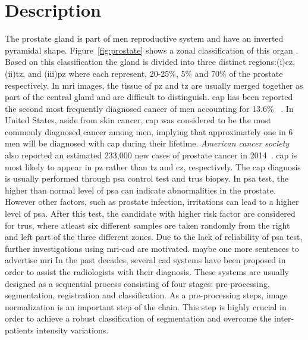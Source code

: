 \graphicspath{ {./content/intro/figures/} }

\section{Description}
\label{sec:descr}  %
The prostate gland is part of men reproductive system and have an inverted pyramidal shape. 
Figure~\ref{fig:prostate} shows a zonal classification of this organ \cite{mcneal1981zonal}. 
Based on this classification the gland is divided into three distinct regions:(i)\ac{cz}, (ii)\ac{tz}, and (iii)\ac{pz} where each represent, 20-25\%, 5\% and 70\% of the prostate respectively. 
In \ac{mri} images, the tissue of \ac{pz} and \ac{tz} are usually merged together as part of the central gland and are difficult to distinguish. 
\ac{cap} has been reported the second most frequently diagnosed cancer of men accounting for 13.6\% ~\cite{ferlay2010estimates}. 
In United States, aside from skin cancer, \ac{cap} was considered to be the most commonly diagnosed cancer among men, implying that approximately one in 6 men will be diagnosed with \ac{cap} during their lifetime. 
\textit{American cancer society} also reported an estimated 233,000 new cases of prostate cancer in 2014~\cite{CancerFactsFigures2014}. 
\Ac{cap} is most likely to appear in \ac{pz} rather than \ac{tz} and \ac{cz}, respectively. 
The \ac{cap} diagnosis is usually performed through \ac{psa} control test and \ac{trus} biopsy.
In \Ac{psa} test, the higher than normal level of \ac{psa} can indicate abnormalities in the prostate. 
However other factors, such as prostate infection, irritations can lead to a higher level of \ac{psa}.
After this test, the candidate with higher risk factor are considered for \ac{trus}, where atleast six different samples are taken randomly from the right and left part of the three different zones. 
Due to the lack of reliability of \ac{psa} test, further investigations using \ac{mri}-\ac{cad} are motivated. 
{\color{red}maybe one more sentences to advertise \ac{mri}}
In the past decades, several \ac{cad} systems have been proposed in order to assist the radiologists with their diagnosis. These systems are usually designed as a sequential process consisting of four stages: pre-processing, segmentation, registration and classification.
As a pre-processing steps, image normalization is an important step of the chain. 
This step is highly crucial in order to achieve a robust classification of segmentation and overcome the inter-patients intensity variations.
